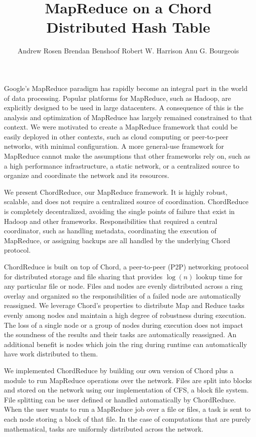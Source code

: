 \documentclass[11pt,letterpaper]{article}
\title{\large MapReduce on a Chord Distributed Hash Table }
\author{\small Andrew Rosen \qquad Brendan Benshoof  \qquad Robert W. Harrison \qquad Anu G. Bourgeois }
\date{}
\begin{document}
\maketitle

Google's MapReduce paradigm has rapidly become an integral part in the world of data processing.
Popular platforms for MapReduce, such as Hadoop, are explicitly designed to be used in large datacenters.  
A consequence of this is the analysis and optimization of MapReduce has largely remained constrained to that context.  
We were motivated to create a MapReduce framework that could be easily deployed in other contexts, such as cloud computing or peer-to-peer networks, with minimal configuration.
A more general-use framework for MapReduce cannot make the assumptions that other frameworks rely on, such as a high performance infrastructure, a static network, or a centralized source to organize and coordinate the network and its resources.  

We present ChordReduce, our MapReduce framework.  It is highly robust, scalable, and does not require a centralized source of coordination.  ChordReduce is completely decentralized, avoiding the single points of failure that exist in Hadoop and other frameworks. Responsibilities  that required a central coordinator, such as handling metadata, coordinating the execution of MapReduce, or assigning backups are all handled by the underlying Chord protocol.

ChordReduce is built on top of Chord, a peer-to-peer (P2P) networking protocol for distributed storage and file sharing that provides $\log(n)$ lookup time for any particular file or node.
Files and nodes are evenly distributed across a ring overlay and organized so the responsibilities of a failed node are automatically reassigned. 
We leverage Chord's properties to distribute Map and Reduce tasks evenly among nodes and maintain a high degree of robustness during execution.  
The loss of a single node or a group of nodes during execution does not impact the soundness of the results and their tasks are automatically reassigned. 
An additional benefit is nodes which join the ring during runtime can automatically have work distributed to them.


We implemented ChordReduce by building our own version of Chord plus a module to run MapReduce operations over the network. Files are split into blocks and stored on the network using our implementation of CFS, a block file system.  File splitting can be user defined or handled automatically by ChordReduce.  When the user wants to run a MapReduce job over a file or files, a task is sent to each node storing a block of that file.  In the case of computations that are purely mathematical, tasks are uniformly distributed across the network.
\end{document}
